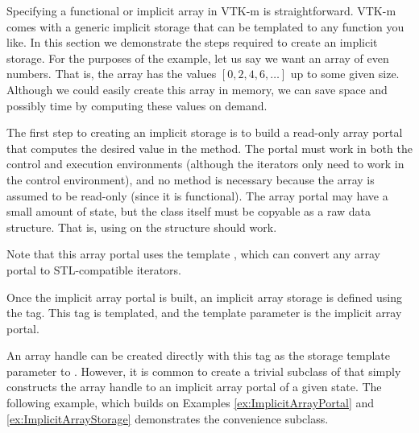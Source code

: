 
Specifying a functional or implicit array in VTK-m is straightforward.
VTK-m comes with a generic implicit storage that can be templated to any
function you like. In this section we demonstrate the steps required to
create an implicit storage. For the purposes of the example, let us say
we want an array of even numbers. That is, the array has the values
$[0,2,4,6,\ldots]$ up to some given size. Although we could easily create
this array in memory, we can save space and possibly time by computing
these values on demand.

The first step to creating an implicit storage is to build a read-only
array portal that computes the desired value in the 
method. The portal must work in both the control and execution environments
(although the iterators only need to work in the control environment), and
no  method is necessary because the array is assumed to be
read-only (since it is functional). The array portal may have a small
amount of state, but the class itself must be copyable as a raw data
structure. That is, using  on the structure should work.


Note that this array portal uses the template
, which can convert any array
portal to STL-compatible iterators.

Once the implicit array portal is built, an implicit array storage is
defined using the  tag. This tag
is templated, and the template parameter is the implicit array portal.


An array handle can be created directly with this tag as the storage
template parameter to . However, it is common to
create a trivial subclass of  that simply constructs
the array handle to an implicit array portal of a given state. The
following example, which builds on Examples \ref{ex:ImplicitArrayPortal}
and \ref{ex:ImplicitArrayStorage} demonstrates the convenience
 subclass.

